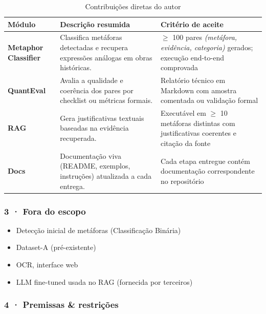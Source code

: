 \begin{table}[htbp]
  \small
  \caption{Contribuições diretas do autor}        %
  \label{tab:contribuicoes}
  \centering
  \begin{tabularx}{\linewidth}{@{}>{\RaggedRight\arraybackslash}p{3cm}
                                    >{\RaggedRight\arraybackslash}X
                                    >{\RaggedRight\arraybackslash}p{4.2cm}@{}}
    \toprule
    Módulo & Descrição resumida & Critério de aceite \\ \midrule
    \textbf{Metaphor Classifier} & Classifica metáforas detectadas e recupera expressões análogas em obras históricas. & $\geq$ 100 pares \textit{(metáfora, evidência, categoria)} gerados; execução end-to-end comprovada \\[2pt]
    \textbf{QuantEval} & Avalia a qualidade e coerência dos pares por checklist ou métricas formais. & Relatório técnico em Markdown com amostra comentada ou validação formal \\[2pt]
    \textbf{RAG} & Gera justificativas textuais baseadas na evidência recuperada. & Executável em $\geq$ 10 metáforas distintas com justificativas coerentes e citação da fonte \\
    \textbf{Docs} & Documentação viva (README, exemplos, instruções) atualizada a cada entrega. & Cada etapa entregue contém documentação correspondente no repositório \\ \bottomrule
  \end{tabularx}
\end{table}


\subsubsection{3 · Fora do escopo}\label{fora-do-escopo}

\begin{itemize}
\tightlist
\item
  Detecção inicial de metáforas (Classificação Binária)
\item
  Dataset-A (pré-existente)\\
\item
  OCR, interface web\\
\item
  LLM fine-tuned usada no RAG (fornecida por terceiros)
\end{itemize}

\subsubsection{4 · Premissas \&
restrições}\label{premissas-restriuxe7uxf5es}

